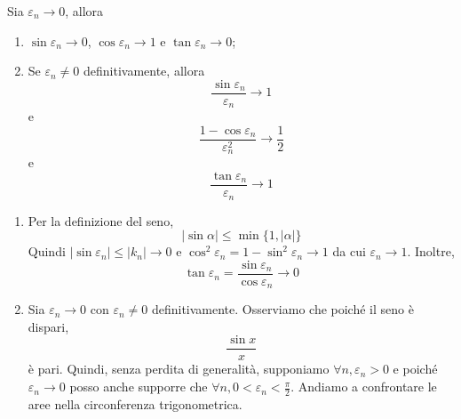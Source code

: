 \documentclass[a4paper]{article}
\begin{document}
\begin{snippettheorem}{}
    Sia \(\varepsilon_n \to 0\), allora
    \begin{enumerate}
        \item \(\sin \varepsilon_n \to 0\), \(\cos \varepsilon_n \to 1\) e \(\tan \varepsilon_n \to 0\);
        \item Se \(\varepsilon_n \neq 0\) definitivamente, allora
        \[
            \frac{\sin \varepsilon_n}{\varepsilon_n} \to 1
        \]
        e
        \[
            \frac{1 - \cos \varepsilon_n}{\varepsilon_n^2} \to \frac{1}{2}
        \]
        e \[
            \frac{\tan \varepsilon_n}{\varepsilon_n} \to 1
        \]
    \end{enumerate}
\end{snippettheorem}

\begin{snippetproof}{}
    \begin{enumerate}
        \item Per la definizione del seno,
        \[
            |\sin \alpha| \leq \min\{1, |\alpha|\}
        \]
        Quindi \(|\sin \varepsilon_n| \leq |k_n| \to 0\)
        e \(\cos^2 \varepsilon_n = 1- \sin^2 \varepsilon_n \to 1\)
        da cui \(\varepsilon_n \to 1\).
        Inoltre,
        \[
            \tan \varepsilon_n = \frac{\sin \varepsilon_n}{\cos \varepsilon_n} \to 0
        \]
        \item Sia \(\varepsilon_n \to 0\) con \(\varepsilon_n \neq 0\)
        definitivamente. Osserviamo che poiché il seno è dispari,
        \[
            \frac{\sin x}{x}
        \]
        è pari. Quindi, senza perdita di generalità, supponiamo
        \(\forall n, \varepsilon_n > 0\)
        e poiché \(\varepsilon_n \to 0\) posso anche supporre che
        \(\forall n, 0 < \varepsilon_n < \frac{\pi}{2}\).
        Andiamo a confrontare le aree nella circonferenza trigonometrica.
        
        \begin{center}
\end{center}
\end{enumerate}
\end{snippetproof}
\end{document}
